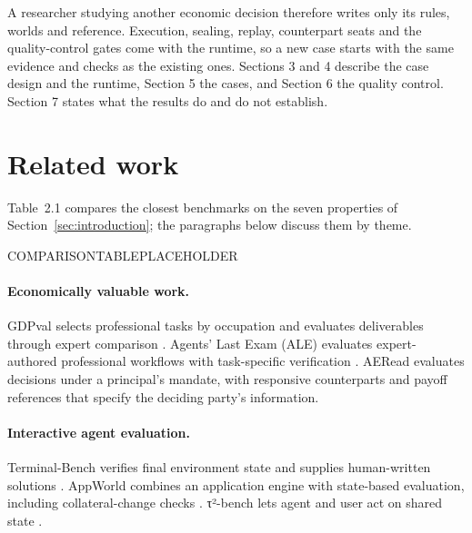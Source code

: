 A researcher studying another economic decision therefore writes only its
rules, worlds and reference. Execution, sealing, replay, counterpart seats
and the quality-control gates come with the runtime, so a new case starts
with the same evidence and checks as the existing ones.
Sections 3 and 4 describe the case design and the runtime, Section 5 the
cases, and Section 6 the quality control. Section 7 states what the results
do and do not establish.

\section{Related work}
\label{sec:related-work}

Table~2.1 compares the closest benchmarks on the seven properties of
Section~\ref{sec:introduction}; the paragraphs below discuss them by theme.

COMPARISONTABLEPLACEHOLDER

\paragraph{Economically valuable work.}
GDPval selects professional tasks by occupation and evaluates deliverables
through expert comparison \citep{patwardhan2025gdpval}. Agents' Last Exam
(ALE) evaluates expert-authored professional workflows with task-specific
verification \citep{sun2026agentslastexam}. AERead evaluates decisions
under a principal's mandate, with responsive counterparts and payoff
references that specify the deciding party's information.

\paragraph{Interactive agent evaluation.}
Terminal-Bench verifies final environment state and supplies human-written
solutions \citep{merrill2026terminalbench}. AppWorld combines an application
engine with state-based evaluation, including collateral-change checks
\citep{trivedi2024appworld}. τ²-bench lets agent and user act on shared
state \citep{barres2025tau2}.

